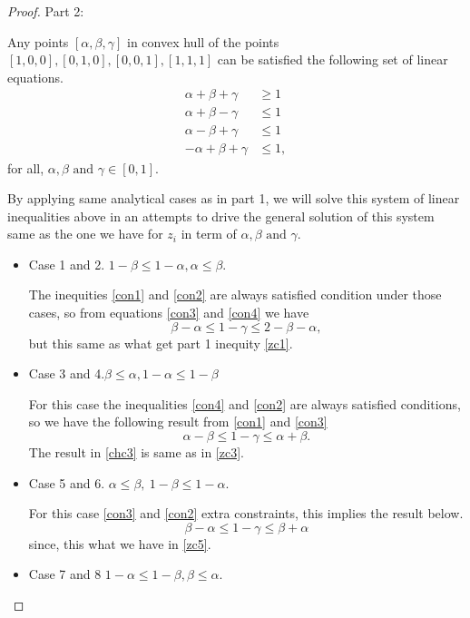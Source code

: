 \begin{proof}
Part 2:

Any points $[\alpha,\beta,\gamma]$ in convex hull of the points $[1, 0, 0], [0, 1, 0], [0, 0, 1], [1, 1, 1]$ can be satisfied the following set of linear equations.
\begin{align}
\alpha+\beta+\gamma &\geq 1\label{con1}\\
\alpha+\beta-\gamma &\leq 1\label{con2}\\
\alpha-\beta+\gamma &\leq 1\label{con3}\\
-\alpha+\beta+\gamma &\leq 1\label{con4},
\end{align}
for all, $ \alpha, \beta \text{ and }\gamma \in [0,1]$.

By applying same analytical cases as in part 1, we will solve this system of linear  inequalities above in an attempts to drive the general solution of this system same as the one we have for $z_i$ in term of $ \alpha, \beta \text{ and }\gamma$.
\begin{itemize}
\item Case 1 and  2. $1-\beta \leq 1-\alpha,\alpha \leq \beta$.

The inequities \ref{con1} and \ref{con2} are always satisfied condition under those cases, so from equations \ref{con3} and \ref{con4} we have
\begin{equation}
\beta-\alpha \leq 1-\gamma \leq 2-\beta-\alpha, 
\end{equation}
but this same as what get part 1  inequity \ref{zc1}.
\item Case 3  and 4.$\beta \leq \alpha,1-\alpha \leq 1-\beta$

For this case the inequalities \ref{con4} and \ref{con2} are always satisfied conditions, so we have the following result from \ref{con1} and \ref{con3} 
\begin{equation}\label{chc3}
\alpha-\beta \leq 1-\gamma \leq \alpha+\beta.
\end{equation}
The result in \ref{chc3} is same as in \ref{zc3}.

\item  Case 5 and 6. $\alpha\leq \beta,\ 1-\beta \leq 1-\alpha$.

For this case  \ref{con3} and \ref{con2} extra constraints, this implies the result below.
\begin{equation}
\beta -\alpha \leq 1-\gamma\leq \beta +\alpha
\end{equation}
since, this what we have in \ref{zc5}.
\item  Case 7 and 8  $1-\alpha \leq 1-\beta,\beta  \leq \alpha$.


\end{itemize}
\end{proof}
